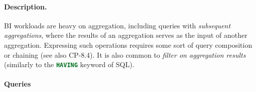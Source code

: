 
\paragraph{Description.}

BI workloads are heavy on aggregation, including queries with \emph{subsequent
    aggregations}, where the results of an aggregation serves as the input of
another aggregation. Expressing such operations requires some sort of query
composition or chaining (see also CP-8.4). It is also common to \emph{filter on
aggregation results} (similarly to the \lstinline[language=sql]{HAVING} keyword of SQL).


\paragraph{Queries}
{\raggedright

}